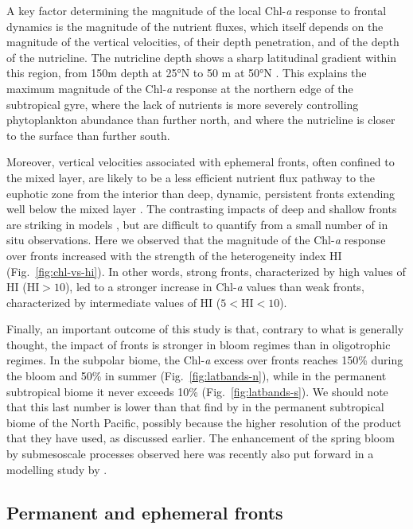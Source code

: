 A key factor determining the magnitude of the local Chl\nobreakdash-\emph{a} response to frontal dynamics is the magnitude of the nutrient fluxes, which itself depends on the magnitude of the vertical velocities, of their depth penetration, and of the depth of the nutricline.
The nutricline depth shows a sharp latitudinal gradient within this region, from 150m depth at 25°N to 50 m at 50°N \citep{romera-castillo_2016}.
This explains the maximum magnitude of the Chl\nobreakdash-\emph{a} response at the northern edge of the subtropical gyre, where the lack of nutrients is more severely controlling phytoplankton abundance than further north, and where the nutricline is closer to the surface than further south.

Moreover, vertical velocities associated with ephemeral fronts, often confined to the mixed layer, are likely to be a less efficient nutrient flux pathway to the euphotic zone from the interior than deep, dynamic, persistent fronts extending well below the mixed layer \citep{levy_2018}.
The contrasting impacts of deep and shallow fronts are striking in models \citep{levy_2012}, but are difficult to quantify from a small number of in situ observations.
Here we observed that the magnitude of the Chl\nobreakdash-\emph{a} response over fronts increased with the strength of the heterogeneity index HI (Fig.~\ref{fig:chl-vs-hi}).
In other words, strong fronts, characterized by high values of HI (\(\mathrm{HI} > 10\)), led to a stronger increase in Chl\nobreakdash-\emph{a} values than weak fronts, characterized by intermediate values of HI (\(5 < \mathrm{HI} < 10\)).

Finally, an important outcome of this study is that, contrary to what is generally thought, the impact of fronts is stronger in bloom regimes than in oligotrophic regimes.
In the subpolar biome, the Chl\nobreakdash-\emph{a}  excess over fronts reaches 150\% during the bloom and 50\% in summer (Fig.~\ref{fig:latbands-n}), while in the permanent subtropical biome it never exceeds  10\% (Fig.~\ref{fig:latbands-s}).
We should note that this last number is lower than that find by \citet{liu_2016} in the permanent subtropical biome of the North Pacific, possibly because the higher resolution of the product that they have used, as discussed earlier.
The enhancement of the spring bloom by submesoscale processes observed here was recently also put forward in a modelling study by \citet{simoes-sousa_2022}.

\subsection{Permanent and ephemeral fronts}

